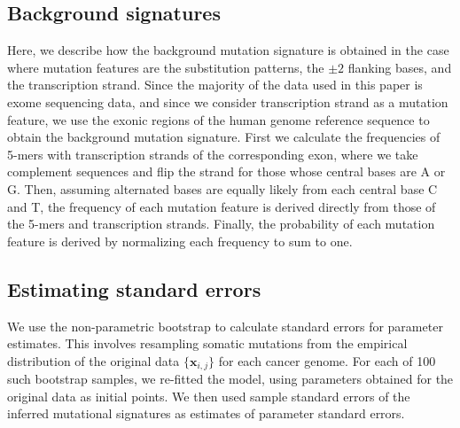 \documentclass[10pt,letterpaper]{article}
\begin{document}
\subsection*{Background signatures}



Here, we describe how the background mutation signature is 
obtained in the case where mutation features are the substitution patterns, the $\pm 2$ flanking bases, and the transcription strand.
Since the majority of the data used in this paper is exome sequencing data, and since we consider transcription strand as a mutation feature,
we use the exonic regions of the human genome reference sequence to obtain the background mutation signature.
First we calculate the frequencies of 5-mers with transcription strands of the corresponding exon,
where we take complement sequences and flip the strand for those whose central bases are A or G.
Then, assuming alternated bases are equally likely from each central base C and T, 
the frequency of each mutation feature is derived directly from those of the 5-mers and transcription strands.
Finally, the probability of each mutation feature is derived by normalizing each frequency to sum to one.



\subsection*{Estimating standard errors}

We use the non-parametric bootstrap \cite{efron1994introduction} to calculate standard errors for parameter estimates. This involves resampling somatic mutations from the empirical distribution of the original data $\{ \bm{x}_{i,j} \}$ for each cancer genome. For each of 100 such bootstrap samples, we re-fitted the model, using parameters obtained for the original data as initial points.
We then used sample standard errors of the inferred mutational signatures as estimates of parameter standard errors.
\end{document}
